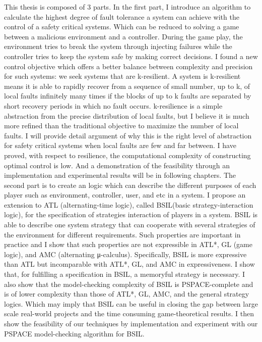 \begin{abstractEN}

This thesis is composed of 3 parts. 
In the first part, I introduce an algorithm to calculate the highest degree of fault tolerance a system can achieve with the control of a safety critical systems. Which can be reduced to solving a game between a malicious environment and a controller. During the game play, the environment tries to break the system through injecting failures while the controller tries to keep the system safe by making correct decisions. I found a new control objective which offers a better balance between complexity and precision for such systems: we seek systems that are k-resilient. A system is k-resilient means it is able to rapidly recover from a sequence of small number, up to k, of local faults infinitely many times if the blocks of up to k faults are separated by short recovery periods in which no fault occurs. k-resilience is a simple abstraction from the precise distribution of local faults, but I believe it is much more refined than the traditional objective to maximize the number of local faults. I will provide detail argument of why this is the right level of abstraction for safety critical systems when local faults are few and far between. I have proved, with respect to resilience, the computational complexity of constructing optimal control is low. And a demonstration of the feasibility through an implementation and experimental results will be in following chapters.
The second part is to create an logic which can describe the different purposes of each player such as environment, controller, user, and etc in a system. I propose an extension to ATL (alternating-time logic), called BSIL(basic strategy-interaction logic), for the specification of strategies interaction of players in a system. BSIL is able to describe one system strategy that can cooperate with several strategies of the environment for different requirements. Such properties are important in practice and I show that such properties are not expressible in ATL*, GL (game logic), and AMC (alternating μ-calculus). Specifically, BSIL is more expressive than ATL but incomparable with ATL*, GL, and AMC in expressiveness. I show that, for fulfilling a specification in BSIL, a memoryful strategy is necessary. I also show that the model-checking complexity of BSIL is PSPACE-complete and is of lower complexity than those of ATL*, GL, AMC, and the general strategy logics. Which may imply that BSIL can be useful in closing the gap between large scale real-world projects and the time consuming game-theoretical results. I then show the feasibility of our techniques by implementation and experiment with our PSPACE model-checking algorithm for BSIL.

\end{abstractEN}
